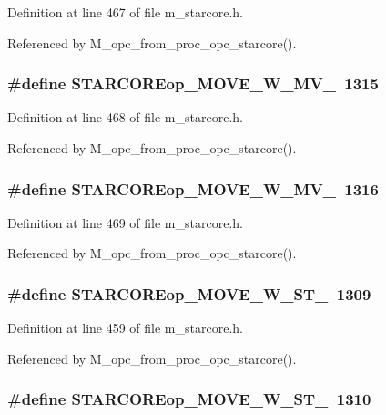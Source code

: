 Definition at line 467 of file m\_\-starcore.h.

Referenced by M\_\-opc\_\-from\_\-proc\_\-opc\_\-starcore().
\subsubsection{\setlength{\rightskip}{0pt plus 5cm}\#define STARCOREop\_\-MOVE\_\-W\_\-MV\_~1315}\label{m__starcore_8h_df3c8223293c54f90e88b820f34d4284}




Definition at line 468 of file m\_\-starcore.h.

Referenced by M\_\-opc\_\-from\_\-proc\_\-opc\_\-starcore().
\subsubsection{\setlength{\rightskip}{0pt plus 5cm}\#define STARCOREop\_\-MOVE\_\-W\_\-MV\_~1316}\label{m__starcore_8h_4678932351feb356c0c42c40343fcc20}




Definition at line 469 of file m\_\-starcore.h.

Referenced by M\_\-opc\_\-from\_\-proc\_\-opc\_\-starcore().
\subsubsection{\setlength{\rightskip}{0pt plus 5cm}\#define STARCOREop\_\-MOVE\_\-W\_\-ST\_~1309}\label{m__starcore_8h_a92e509e8d24da3f50b0fe93de8e0abf}




Definition at line 459 of file m\_\-starcore.h.

Referenced by M\_\-opc\_\-from\_\-proc\_\-opc\_\-starcore().
\subsubsection{\setlength{\rightskip}{0pt plus 5cm}\#define STARCOREop\_\-MOVE\_\-W\_\-ST\_~1310}\label{m__starcore_8h_7005bbc2db44e494f8319fb8be6d3f52}




